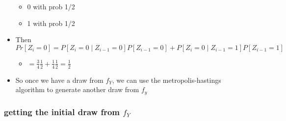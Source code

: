 \documentclass[11pt]{article}
\begin{document}
\begin{itemize}
\begin{itemize}
\item 0 with prob 1/2
\item 1 with prob 1/2
\end{itemize}
\item Then $Pr[Z_i = 0] = P[Z_i = 0 \mid Z_{i-1}=0] P[Z_{i-1} = 0] + P[Z_i = 0 \mid Z_{i-1}=1] P[Z_{i-1} = 1]$
\begin{itemize}
\item $= \frac{3}{4} \frac{1}{2} + \frac{1}{4} \frac{1}{2} = \frac12$
\end{itemize}
\item So once we have a draw from $f_Y$, we can use the
        metropolis-hastings algorithm to generate another draw from $f_y$
\end{itemize}
\subsubsection{getting the initial draw from $f_Y$}
\label{sec-3-2-2}
\end{document}
